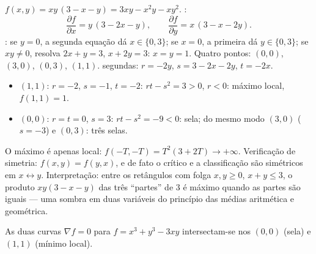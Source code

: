 \begin{example}
\label{ex:b1:multivar:fourpoints}
$f(x, y) = xy\,(3 - x - y) = 3xy - x^2y - xy^2$. :
\[
\frac{\partial f}{\partial x} = y\,(3 - 2x - y),
\qquad
\frac{\partial f}{\partial y} = x\,(3 - x - 2y).
\]
: se $y = 0$, a segunda equação dá $x \in
\{0, 3\}$; se $x = 0$, a
primeira dá $y \in \{0, 3\}$; se $xy
\neq 0$, resolva $2x + y = 3$, $x + 2y = 3$: $x = y = 1$. Quatro
pontos: $(0,0)$, $(3,0)$, $(0,3)$, $(1,1)$.  segundas:
$r = -2y$, $s = 3 - 2x - 2y$, $t = -2x$.
\begin{itemize}
  \item $(1,1)$: $r = -2$, $s = -1$, $t = -2$: $rt - s^2 = 3 >
        0$, $r < 0$: máximo
        local, $f(1,1) = 1$.
  \item $(0,0)$: $r = t = 0$, $s = 3$: $rt - s^2 = -9 < 0$: sela; do mesmo modo
        $(3, 0)$ ($s = -3$) e $(0, 3)$: três selas.
\end{itemize}
O máximo é apenas local: $f(-T, -T) = T^2(3 + 2T) \to
+\infty$. Verificação de simetria: $f(x, y) = f(y, x)$, e de
fato o  crítico e a classificação são simétricos em $x
\leftrightarrow y$.
Interpretação: entre os retângulos com folga $x, y \geq 0$, $x + y \leq 3$, o produto
$xy(3 - x - y)$ das três ``partes'' de $3$ é máximo quando as partes são iguais
--- uma sombra em duas variáveis do princípio das médias aritmética e
geométrica.
\end{example}

\begin{omfigure}

{\small As duas curvas $\nabla f = 0$ para $f = x^3 + y^3 - 3xy$ intersectam-se nos  $(0,0)$ (sela) e $(1,1)$ (mínimo local).}
\end{omfigure}

